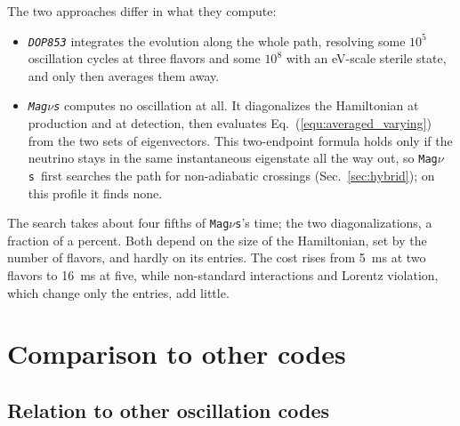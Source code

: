 \documentclass[final,5p,times,twocolumn,sort,compress]{elsarticle}
\makeatletter
\newcommand{\eq}{Eq.}
\DeclareRobustCommand{\_}{%
  \ifmmode\nfss@text{\textunderscore}\else\textunderscore\allowbreak\fi}
\newcommand{\equ}[1]{\eq~(\ref{equ:#1})}
\newcommand{\magnus}{{\tt Mag}\ensuremath{\nu}{\tt s}}
\makeatother
\begin{document}
The two approaches differ in what they compute:
\begin{itemize}
\item \textit{{\tt DOP853}} integrates the evolution along the whole path, resolving some $10^{5}$ oscillation cycles at three flavors and some $10^{8}$ with an eV-scale sterile state, and only then averages them away.
\item \textit{\magnus} computes no oscillation at all. It diagonalizes the Hamiltonian at production and at detection, then evaluates \equ{averaged_varying} from the two sets of eigenvectors. This two-endpoint formula holds only if the neutrino stays in the same instantaneous eigenstate all the way out, so \magnus\ first searches the path for non-adiabatic crossings (Sec.~\ref{sec:hybrid}); on this profile it finds none.
\end{itemize}
The search takes about four fifths of \magnus's time; the two diagonalizations, a fraction of a percent. Both depend on the size of the Hamiltonian, set by the number of flavors, and hardly on its entries. The cost rises from 5~ms at two flavors to 16~ms at five, while non-standard interactions and Lorentz violation, which change only the entries, add little.


\section{Comparison to other codes}
\label{sec:comparison}


\subsection{Relation to other oscillation codes}
\label{sec:relation}
\end{document}

